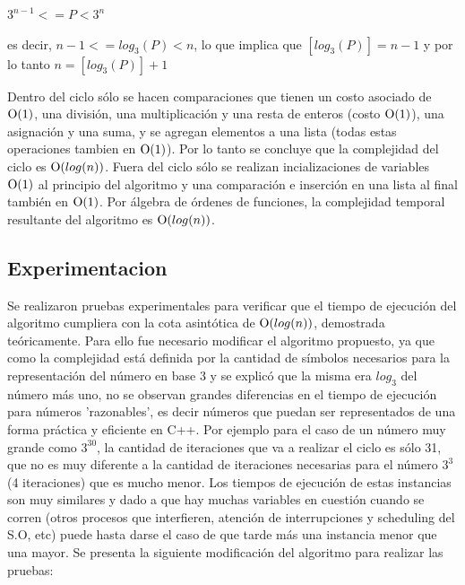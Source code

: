 	\newline
	$3^{n-1} <= P < 3^n$

	\newline
	es decir, $n -1 <= log_3(P) < n$, lo que implica que $[log_3(P)] = n - 1$ y por lo tanto $n = [log_3(P)] + 1$


	Dentro del ciclo sólo se hacen comparaciones que tienen un costo asociado de $\operatorname{O}(1)$, una división, una multiplicación y una resta de enteros (costo $\operatorname{O}(1)$), una asignación y una suma, y se agregan elementos a una lista (todas estas operaciones tambien en $\operatorname{O}(1)$). Por lo tanto se concluye que la complejidad del ciclo es $\operatorname{O}(log(n))$. Fuera del ciclo sólo se realizan incializaciones de variables $\operatorname{O}(1)$ al principio del algoritmo y una comparación e inserción en una lista al final también en $\operatorname{O}(1)$. Por álgebra de órdenes de funciones, la complejidad temporal resultante del algoritmo es $\operatorname{O}(log(n))$. 


    \subsection{Experimentacion}
         

	Se realizaron pruebas experimentales para verificar que el tiempo de
	ejecución del algoritmo cumpliera con la cota asintótica de $\operatorname{O}(log(n))$,
	demostrada teóricamente. Para ello fue necesario modificar el algoritmo propuesto, ya que como la complejidad está definida por la cantidad de símbolos necesarios para la representación del número en base 3 y se explicó que la misma era $log_3$ del número más uno, no se observan grandes diferencias en el tiempo de ejecución para números 'razonables', es decir números que puedan ser representados de una forma práctica y eficiente en C++. Por ejemplo para el caso de un número muy grande como $3^{30}$, la cantidad de iteraciones que va a realizar el ciclo es sólo 31, que no es muy diferente a la cantidad de iteraciones necesarias para el número $3^{3}$ (4 iteraciones) que es mucho menor. Los tiempos de ejecución de estas instancias son muy similares y dado a que hay muchas variables en cuestión cuando se corren (otros procesos que interfieren, atención de interrupciones y scheduling del S.O, etc) puede hasta darse el caso de que tarde más una instancia menor que una mayor. Se presenta la siguiente modificación del algoritmo para realizar las pruebas:

